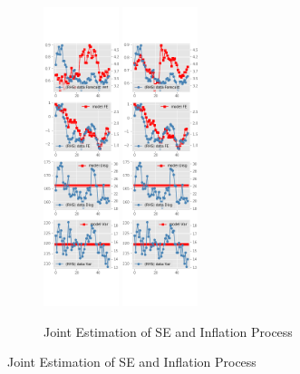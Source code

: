 \documentclass[]{article}
\begin{document}
\begin{figure}[ht]
\begin{subfigure}[b]{\textwidth}
		\centering
		\caption{Joint Estimation of SE and Inflation Process}
		\label{NI_diag_joint_SCE}
		\includegraphics[width=0.24\textwidth]{figures/sce_ni_est_joint_diag0.png}
		\includegraphics[width=0.24\textwidth]{figures/sce_ni_est_joint_diag1.png}

\end{subfigure}
\end{figure}
\end{document}
